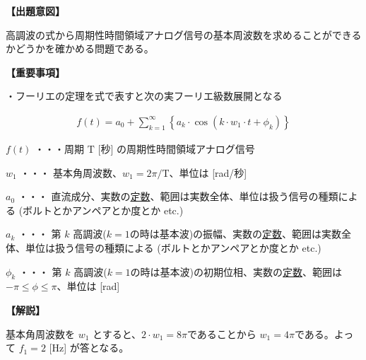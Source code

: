 \noindent \textbf{【出題意図】}

\noindent 高調波の式から周期性時間領域アナログ信号の基本周波数を求めることができるかどうかを確かめる問題である。

\vspace{1em}
\noindent \textbf{【重要事項】}

\medskip
\noindent ・フーリエの定理を式で表すと次の実フーリエ級数展開となる

\begin{align*}
f(t) = a_0 + \sum_{k=1}^{\infty}
\left \{
a_k \cdot \cos (k \cdot w_1 \cdot t + \phi_k)
\right \}
\end{align*}

\medskip
\noindent $f(t)$ ・・・周期 $\textrm{T}$ [秒] の周期性時間領域アナログ信号

\medskip
\noindent $w_1$ ・・・ 基本角周波数、$w_1 = 2\pi/\textrm{T}$、単位は [rad/秒]

\medskip
\noindent $a_0$ ・・・ 直流成分、実数の\underline{定数}、範囲は実数全体、単位は扱う信号の種類による (ボルトとかアンペアとか度とか etc.)

\medskip
\noindent $a_k$ ・・・ 第 $k$ 高調波($k=1$の時は基本波)の振幅、実数の\underline{定数}、範囲は実数全体、単位は扱う信号の種類による (ボルトとかアンペアとか度とか etc.)

\medskip
\noindent $\phi_k$ ・・・ 第 $k$ 高調波($k=1$の時は基本波)の初期位相、実数の\underline{定数}、範囲は $-\pi \leq \phi \leq \pi$、単位は [rad]


\vspace{1em}
\noindent \textbf{【解説】}

\noindent 基本角周波数を $w_1$ とすると、$2 \cdot w_1 = 8\pi$であることから $w_1 = 4\pi$である。よって $f_1 = 2$ [Hz] が答となる。
